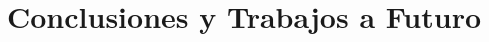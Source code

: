 \documentclass[12pt,twoside]{book}
\begin{document}

\chapter{Conclusiones y Trabajos a Futuro}
    \label{capConc}



    



%




%
\end{document}
